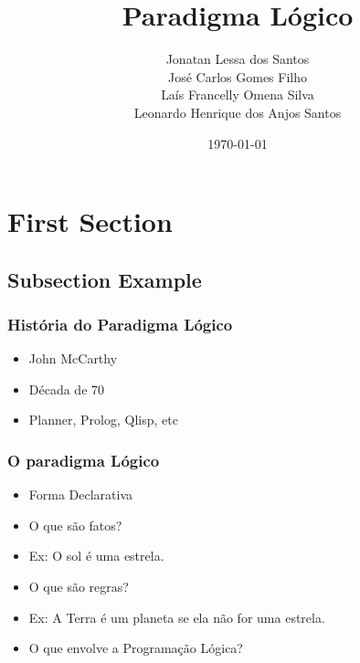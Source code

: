 \documentclass{beamer}
\title[Introdução ao paradigma Lógico]{Paradigma Lógico} %
\author{Jonatan Lessa dos Santos \\
        José Carlos Gomes Filho \\
        Laís Francelly Omena Silva \\
        Leonardo Henrique dos Anjos Santos} %
\institute[IFAL] %
{
Instituto Federal de Alagoas \\ %
\medskip
\textit{Semestre 2018-2} %
}
\date{\today} %
\begin{document}
\begin{frame}
\titlepage %
\end{frame}


\section{First Section} %

\subsection{Subsection Example} %

\begin{frame}
\frametitle{História do Paradigma Lógico}
\begin{itemize}
    \item John McCarthy
    \item Década de 70 
    \item Planner, Prolog, Qlisp, etc
\end{itemize}


\end{frame}


\begin{frame}
\frametitle{O paradigma Lógico}
\begin{itemize}
\item Forma Declarativa
\item O que são fatos?
\item Ex: O sol é uma estrela.
\item O que são regras?
\item Ex: A Terra é um planeta se ela não for uma estrela.
\item O que envolve a Programação Lógica?
\end{itemize}
\end{frame}
\end{document}
